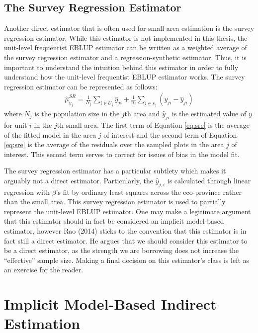 \documentclass[12pt,twoside]{reedthesis}
\begin{document}
\hypertarget{the-survey-regression-estimator}{%
\subsection{The Survey Regression Estimator}\label{the-survey-regression-estimator}}

Another direct estimator that is often used for small area estimation is the survey regression estimator. While this estimator is not implemented in this thesis, the unit-level frequentist EBLUP estimator can be written as a weighted average of the survey regression estimator and a regression-synthetic estimator. Thus, it is important to understand the intuition behind this estimator in order to fully understand how the unit-level frequentist EBLUP estimator works. The survey regression estimator can be represented as follows:
\begin{align}
\hat \mu_{y_j}^{SR} = \frac{1}{N_j} \sum_{i \in U_j} \hat y_{ji} +
\frac{1}{n_j} \sum_{i \in s_j} (y_{ji} - \hat y_{ji}) \label{eq:sre}
\end{align}
where \(N_j\) is the population size in the \(j\)th area and \(\hat y_{ji}\) is the estimated value of \(y\) for unit \(i\) in the \(j\)th small area. The first term of Equation \eqref{eq:sre} is the average of the fitted model in the area \(j\) of interest and the second term of Equation \eqref{eq:sre} is the average of the residuals over the sampled plots in the area \(j\) of interest. This second term serves to correct for issues of bias in the model fit.

The survey regression estimator has a particular subtlety which makes it arguably not a direct estimator. Particularly, the \(\hat y_{j,i}\) is calculated through linear regression with \(\beta\)'s fit by ordinary least squares across the eco-province rather than the small area. This survey regression estimator is used to partially represent the unit-level EBLUP estimator. One may make a legitimate argument that this estimator should in fact be considered an implicit model-based estimator, however Rao (2014) sticks to the convention that this estimator is in fact still a direct estimator. He argues that we should consider this estimator to be a direct estimator, as the strength we are borrowing does not increase the ``effective'' sample size. Making a final decision on this estimator's class is left as an exercise for the reader.

\hypertarget{implicit-model-based-indirect-estimation}{%
\section{Implicit Model-Based Indirect Estimation}\label{implicit-model-based-indirect-estimation}}
\end{document}
